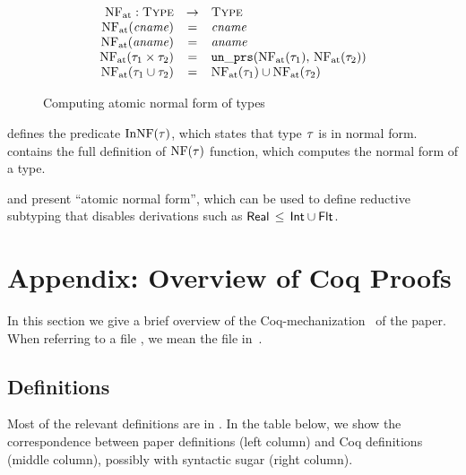 \begin{figure}
	\[
	\begin{array}{rcl}
	\mathop{\mathrm{NF}_{\mathrm{at}}}: \textsc{Type} &\rightarrow& \textsc{Type} \\
	\mathop{\mathrm{NF}_{\mathrm{at}}}(\mathit{cname}) &=& \mathit{cname} \\
	\mathop{\mathrm{NF}_{\mathrm{at}}}(\mathit{aname}) &=& \mathit{aname} \\
	\mathop{\mathrm{NF}_{\mathrm{at}}}(\tau_1 \times \tau_2) &=& \mathop{\mathtt{un\_prs}}(\mathop{\mathrm{NF}_{\mathrm{at}}}(\tau_1), \, \mathop{\mathrm{NF}_{\mathrm{at}}}(\tau_2))	\\
	\mathop{\mathrm{NF}_{\mathrm{at}}}(\tau_1 \cup \tau_2) &=& \mathop{\mathrm{NF}_{\mathrm{at}}}(\tau_1) \cup \mathop{\mathrm{NF}_{\mathrm{at}}}(\tau_2) \\
	\end{array}
	\]
	\caption{Computing atomic normal form of \BetaJulia types}
	\label{fig:bjnom-calc-nf-full}
\end{figure}

 defines the predicate $\mathop{\mathrm{InNF}}(\tau)$, which states
that type $\tau$ is in normal form.
 contains the full definition of $\mathop{\mathrm{NF}}(\tau)$ 
function, which computes the normal form of a type.

 and  present 
``atomic normal form'', which can be used to define reductive subtyping
that disables derivations such as $\mathsf{Real} \, \leq \, \mathsf{Int} \cup \mathsf{Flt}$.


\section{Appendix: Overview of Coq Proofs}\label{app:proofs}

In this section we give a brief overview of 
the Coq-mecha\-ni\-za\-tion~\cite{bib:MiniJlCoq} of the paper.
When referring to a file , 
we mean the file  in~\cite{bib:MiniJlCoq}.

\subsection{Definitions}

Most of the relevant definitions are in .
In the table below, 
we show the correspondence between paper definitions (left column)
and Coq definitions (middle column),
possibly with syntactic sugar (right column).

